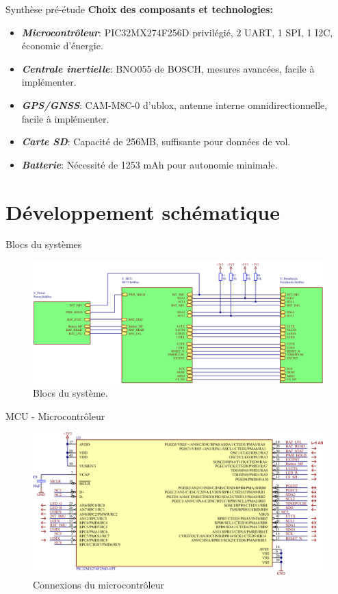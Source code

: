 \documentclass{beamer}
\begin{document}
\begin{frame}{Synthèse pré-étude}
	\textbf{Choix des composants et technologies:}
	\begin{itemize}
		\item \textit{\textbf{Microcontrôleur}}: PIC32MX274F256D privilégié, 2 UART, 1 SPI, 1 I2C, économie d'énergie.
		\item \textit{\textbf{Centrale inertielle}}: BNO055 de BOSCH, mesures avancées, facile à implémenter.
		\item \textit{\textbf{GPS/GNSS}}: CAM-M8C-0 d'ublox, antenne interne omnidirectionnelle, facile à implémenter.
		\item \textit{\textbf{Carte SD}}: Capacité de 256MB, suffisante pour données de vol.
		\item \textit{\textbf{Batterie}}: Nécessité de 1253 mAh pour autonomie minimale.
	\end{itemize}
\end{frame}

\section{Développement schématique}

\begin{frame}{Blocs du systèmes}
	\begin{figure}[h]
		\centering
		\includegraphics[width=1\linewidth]{../figures/etude/sch/BLOCS}
		\caption{Blocs du système.}
		\label{fig:blocs}
	\end{figure}
\end{frame}

\begin{frame}{MCU - Microcontrôleur}
	\begin{figure}[h]
		\centering
			\includegraphics[width=1\linewidth]{../figures/etude/sch/MCU}
		\caption{Connexions du microcontrôleur}
		\label{fig:mcu}
	\end{figure}
\end{frame}
\end{document}
